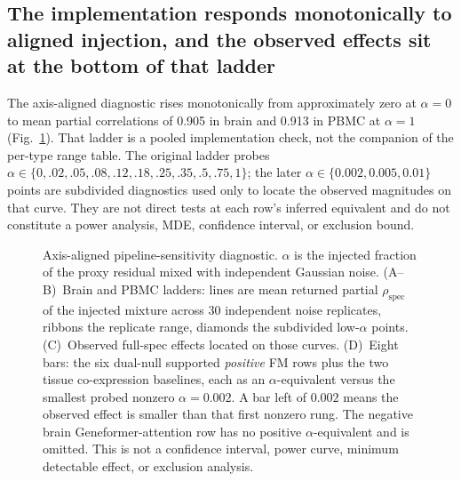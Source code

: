 \documentclass[fleqn,10pt,lineno]{wlpeerj}
\newcommand{\fitfig}[1]{\resizebox{\ifdim\width>\linewidth\linewidth\else\width\fi}{!}{#1}}
\begin{document}
\subsection{The implementation responds monotonically to aligned injection, and the observed
effects sit at the bottom of that ladder}
The axis-aligned diagnostic rises monotonically from approximately zero at $\alpha=0$ to mean
partial correlations of 0.905 in brain and 0.913 in PBMC at $\alpha=1$
(Fig.~\ref{fig:sensitivity}). That ladder is a pooled implementation check, not the companion of the per-type range table. The original ladder probes $\alpha\in\{0,.02,.05,.08,.12,.18,.25,.35,.5,.75,1\}$;
the later $\alpha\in\{0.002,0.005,0.01\}$ points are subdivided diagnostics used only to locate the observed
magnitudes on that curve. They are not direct tests at each row's inferred equivalent and do not
constitute a power analysis, MDE, confidence interval, or exclusion bound.

\begin{figure}[!tbp]\centering
\fitfig{}
\caption{Axis-aligned pipeline-sensitivity diagnostic. $\alpha$ is the injected fraction of the
proxy residual mixed with independent Gaussian noise. (A--B)~Brain and PBMC ladders: lines are
mean returned partial $\rho_{\mathrm{spec}}$ of the injected mixture across 30 independent noise replicates, ribbons the replicate range,
diamonds the subdivided low-$\alpha$ points. (C)~Observed full-spec effects located on those
curves. (D)~Eight bars: the six dual-null supported \emph{positive} FM rows plus the two tissue
co-expression baselines, each as an $\alpha$-equivalent versus the smallest probed nonzero
$\alpha=0.002$. A bar left of $0.002$ means the observed effect is smaller than that first
nonzero rung. The negative brain Geneformer-attention row has no positive $\alpha$-equivalent
and is omitted. This is not a confidence interval, power curve, minimum detectable
effect, or exclusion analysis.}
\label{fig:sensitivity}
\end{figure}
\FloatBarrier
\end{document}
